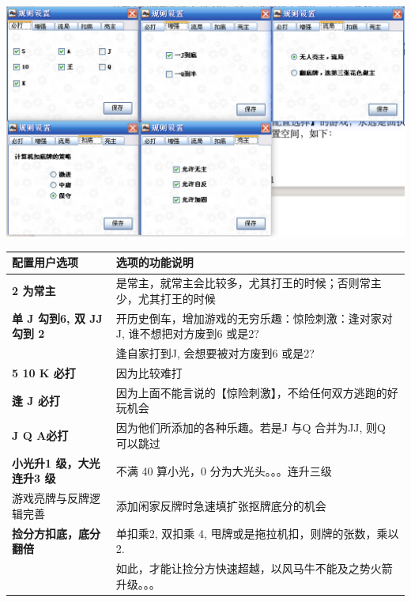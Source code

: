 \documentclass[9pt, b5paper]{article}
\begin{document}
\begin{center}
\includegraphics[width=.9\linewidth]{./pic/readme_20230510_160604.png}
\end{center}
\begin{center}
\begin{tabular}{ll}
\hline
配置用户选项 & 选项的功能说明\\
\hline
\textbf{2 为常主} & 是常主，就常主会比较多，尤其打王的时候；否则常主少，尤其打王的时候\\
\hline
\textbf{单 J 勾到6, 双 JJ 勾到 2} & 开历史倒车，增加游戏的无穷乐趣：惊险刺激：逢对家对J, 谁不想把对方废到6 或是2?\\
 & 逢自家打到J, 会想要被对方废到6 或是2?\\
\hline
\textbf{5 10 K 必打} & 因为比较难打\\
\textbf{逢 J 必打} & 因为上面不能言说的【惊险刺激】，不给任何双方逃跑的好玩机会\\
\textbf{J Q A必打} & 因为他们所添加的各种乐趣。若是J 与Q 合并为JJ, 则Q 可以跳过\\
\hline
\textbf{小光升1 级，大光连升3 级} & 不满 40 算小光，0 分为大光头。。。连升三级\\
\hline
游戏亮牌与反牌逻辑完善 & 添加闲家反牌时急速填扩张抠牌底分的机会\\
\hline
\textbf{捡分方扣底，底分翻倍} & 单扣乘2, 双扣乘 4, 甩牌或是拖拉机扣，则牌的张数，乘以 2.\\
 & 如此，才能让捡分方快速超越，以风马牛不能及之势火箭升级。。。\\
\hline
\end{tabular}
\end{center}
\end{document}
